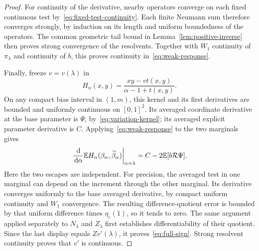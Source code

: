 \begin{proof}
For continuity of the derivative, nearby operators converge on each fixed continuous test by~\eqref{eq:fixed-test-continuity}. Each finite Neumann sum therefore converges strongly, by induction on its length and uniform boundedness of the operators. The common geometric tail bound in Lemma~\ref{lem:positive-inverse} then proves strong convergence of the resolvents. Together with $W_1$ continuity of $\pi_\lambda$ and continuity of $b$, this proves continuity in~\eqref{eq:weak-response}.

Finally, freeze $v=v(\lambda)$ in
\[
 H_\alpha(x,y)=\frac{xy-vt(x,y)}{\alpha-1+t(x,y)}.
\]
On any compact bias interval in $(1,m)$, this kernel and its first derivatives are bounded and uniformly continuous on $[0,1]^2$. Its averaged coordinate derivative at the base parameter is $\Psi$, by~\eqref{eq:variation-kernel}; its averaged explicit parameter derivative is $C$. Applying~\eqref{eq:weak-response} to the two marginals gives
\[
 \left.\frac{\,\mathrm d}{\,\mathrm d\alpha}
 \mathbb E H_\alpha(\beta_\alpha,\widetilde\beta_\alpha)
 \right|_{\alpha=\lambda}
 =C-2\mathbb E[b\mathcal R\Psi].
\]
Here the two escapes are independent. For precision, the averaged test in one marginal can depend on the increment through the other marginal. Its derivative converges uniformly to the base averaged derivative, by compact uniform continuity and $W_1$ convergence. The resulting difference-quotient error is bounded by that uniform difference times $\eta_\varepsilon(1)$, so it tends to zero. The same argument applied separately to $N_\lambda$ and $Z_\lambda$ first establishes differentiability of their quotient. Since the last display equals $Z v'(\lambda)$, it proves~\eqref{eq:full-sign}. Strong resolvent continuity proves that $v'$ is continuous.
\end{proof}
